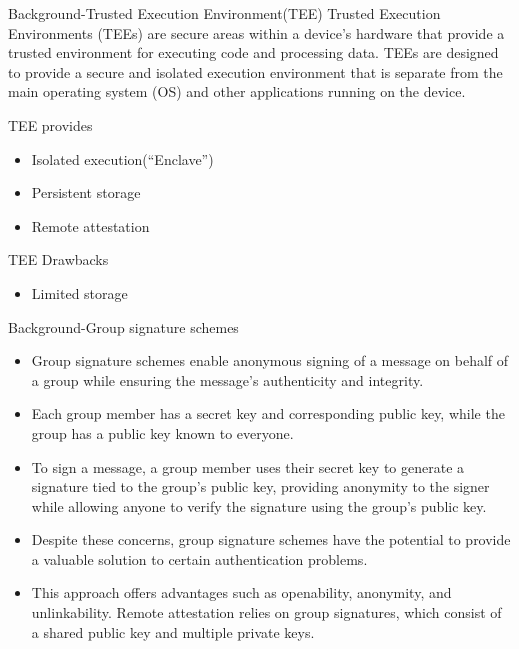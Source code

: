 \documentclass{beamer}
\begin{document}
\begin{frame}{Background-Trusted Execution Environment(TEE)}
	Trusted Execution Environments (TEEs) are secure areas within a device's hardware that provide a trusted environment for executing code and processing data. TEEs are designed to provide a secure and isolated execution environment that is separate from the main operating system (OS) and other applications running on the device.

	TEE provides
	\begin{itemize}
		\item Isolated execution(“Enclave”)
		\item Persistent storage
		\item Remote attestation
	\end{itemize}

	TEE Drawbacks
	\begin{itemize}
		\item Limited storage
	\end{itemize}
\end{frame}

\begin{frame}{Background-Group signature schemes}
	\begin{itemize}
		\item Group signature schemes enable anonymous signing of a message on behalf of a group while ensuring the message's authenticity and integrity.
		\item Each group member has a secret key and corresponding public key, while the group has a public key known to everyone.
		\item To sign a message, a group member uses their secret key to generate a signature tied to the group's public key, providing anonymity to the signer while allowing anyone to verify the signature using the group's public key.
		\item Despite these concerns, group signature schemes have the potential to provide a valuable solution to certain authentication problems.
		\item This approach offers advantages such as openability, anonymity, and unlinkability. Remote attestation relies on group signatures, which consist of a shared public key and multiple private keys.
	\end{itemize}
\end{frame}
\end{document}
